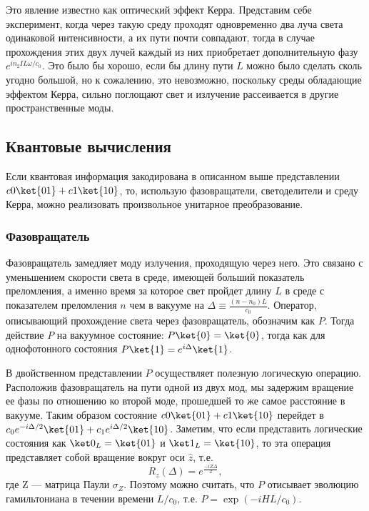 Это явление известно как оптический эффект Керра. Представим себе эксперимент,
когда через такую среду проходят одновременно два луча света одинаковой
интенсивности, а их пути почти совпадают, тогда в случае прохождения этих двух
лучей каждый из них приобретает дополнительную фазу $e^{in_2IL\omega/c_0}$.
Это было бы хорошо, если бы длину пути $L$ можно было сделать сколь угодно
большой, но к сожалению, это невозможно, поскольку среды обладающие эффектом
Керра, сильно поглощают свет и излучение рассеивается в другие пространственные
моды.

\subsection{Квантовые вычисления}

Если квантовая информация закодирована в описанном выше представлении
$c0\ket{01} + c1\ket{10}$, то, использую фазовращатели, светоделители и среду
Керра, можно реализовать произвольное унитарное преобразование.

\subsubsection{Фазовращатель}

Фазовращатель замедляет моду излучения, проходящую через него. Это связано с
уменьшением скорости света в среде, имеющей больший показатель преломления, а
именно время за которое свет пройдет длину $L$ в среде с показателем
преломления $n$ чем в вакууме на $\Delta \equiv \frac{(n - n_0)L}{c_0}$.
Оператор, описывающий прохождение света через фазовращатель, обозначим как $P$.
Тогда действие $P$ на вакуумное состояние: $P\ket{0} = \ket{0}$, тогда как
для однофотонного состояния $P\ket{1} = e^{i\Delta}\ket{1}$.

В двойственном представлении $P$ осуществляет полезную логическую операцию.
Расположив фазовращатель на пути одной из двух мод, мы задержим вращение ее
фазы по отношению ко второй моде, прошедшей то же самое расстояние в вакууме.
Таким образом состояние $c0\ket{01} + c1\ket{10}$ перейдет в
$c_0e^{-i\Delta/2}\ket{01} + c_1e^{i\Delta/2}\ket{10}$. Заметим, что если
представить логические состояния как $\ket0_L=\ket{01}$ и $\ket1_L=\ket{10}$,
то эта операция представляет собой вращение вокруг оси $\hat{z}$, т.е.
\begin{equation}
  R_z(\Delta) = e^{\frac{-iZ\Delta}{2}},
\end{equation}
где Z --- матрица Паули $\sigma_Z$. Поэтому можно считать, что $P$ отисывает
эволюцию гамильтониана в течении времени $L/c_0$, т.е. $P=\exp(-iHL/c_0)$.

